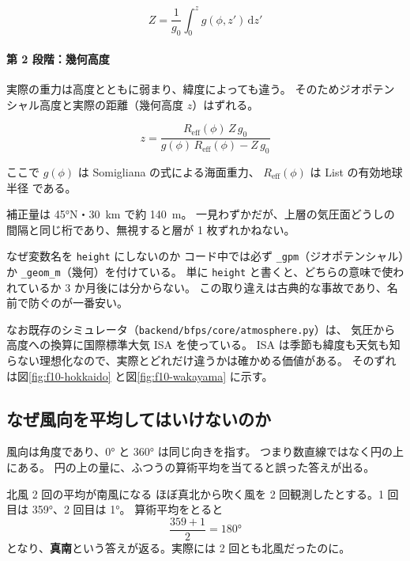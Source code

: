 \begin{equation}
  Z = \frac{1}{g_0}\int_0^z g(\phi, z')\, \mathrm{d}z'
\end{equation}

\paragraph{第 2 段階：幾何高度}
実際の重力は高度とともに弱まり、緯度によっても違う。
そのためジオポテンシャル高度と実際の距離（幾何高度 $z$）はずれる。

\begin{equation}
  z = \frac{R_\mathrm{eff}(\phi)\, Z\, g_0}{g(\phi)\, R_\mathrm{eff}(\phi) - Z\, g_0}
\end{equation}

ここで $g(\phi)$ は Somigliana の式による海面重力、
$R_\mathrm{eff}(\phi)$ は List の有効地球半径 \citep{list1968smithsonian} である。

補正量は \ang{45}N・\SI{30}{\kilo\metre} で約 \SI{+140}{\metre}。
一見わずかだが、上層の気圧面どうしの間隔と同じ桁であり、無視すると層が 1 枚ずれかねない。

\begin{whybox}{なぜ変数名を \texttt{height} にしないのか}
コード中では必ず \texttt{\_gpm}（ジオポテンシャル）か \texttt{\_geom\_m}（幾何）を付けている。
単に \texttt{height} と書くと、どちらの意味で使われているか 3 か月後には分からない。
この取り違えは古典的な事故であり、名前で防ぐのが一番安い。
\end{whybox}

なお既存のシミュレータ（\texttt{backend/bfps/core/atmosphere.py}）は、
気圧から高度への換算に国際標準大気 ISA \citep{icao1993isa} を使っている。
ISA は季節も緯度も天気も知らない理想化なので、実際とどれだけ違うかは確かめる価値がある。
そのずれは図\ref{fig:f10-hokkaido} と図\ref{fig:f10-wakayama} に示す。

\subsection{なぜ風向を平均してはいけないのか}
\label{sec:circular}

風向は角度であり、\ang{0} と \ang{360} は同じ向きを指す。
つまり数直線ではなく円の上にある。
円の上の量に、ふつうの算術平均を当てると誤った答えが出る。

\begin{whybox}{北風 2 回の平均が南風になる}
ほぼ真北から吹く風を 2 回観測したとする。1 回目は \ang{359}、2 回目は \ang{1}。
算術平均をとると
\[
  \frac{359 + 1}{2} = \ang{180}
\]
となり、\textbf{真南}という答えが返る。実際には 2 回とも北風だったのに。
\end{whybox}

